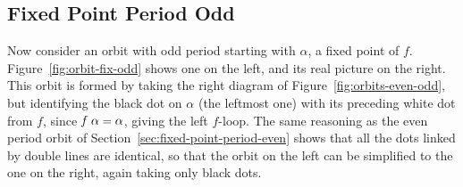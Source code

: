 \documentclass[sigplan,screen]{acmart}
\renewcommand{\HOLinline}[1]{\ensuremath{#1}} %
\renewcommand{\HOLSymConst}[1]{{\fontsize{9pt}{1em}\selectfont\textsf{\upshape #1}}}
\begin{document}
\subsection{Fixed Point Period Odd}
\label{sec:fixed-point-period-odd}
Now consider an orbit with odd period starting with $\alpha$, a fixed point of $f$.
Figure~\ref{fig:orbit-fix-odd} shows one on the left, and its real picture on the right.
This orbit is formed by taking the right diagram of Figure~\ref{fig:orbits-even-odd},
but identifying the black dot on $\alpha$ (the leftmost one) with its preceding white dot from $f$, since \HOLinline{\HOLFreeVar{f}\;\HOLFreeVar{\alpha}\;\HOLSymConst{=}\;\HOLFreeVar{\alpha}}, giving the left $f$-loop.
The same reasoning as the even period orbit of Section~\ref{sec:fixed-point-period-even} shows that all the dots linked by double lines are identical, so that the orbit on the left can be simplified to the one on the right, again taking only black dots.
\end{document}
